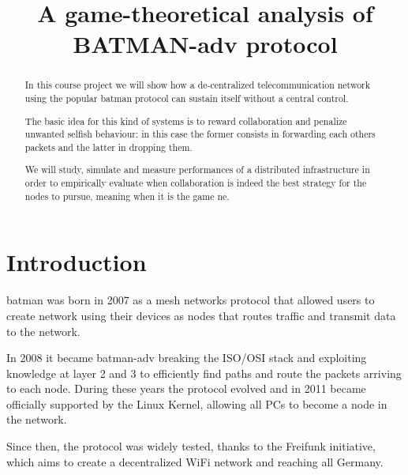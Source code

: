 \documentclass[conference]{IEEEtran}
\begin{document}
\title{A game-theoretical analysis of BATMAN-adv protocol}

\author{
\and
{}
}

\maketitle

\begin{abstract}
  In this course project we will show how a de-centralized telecommunication network using the popular \gls{batman} protocol can sustain itself without a central control.

  The basic idea for this kind of systems is to reward collaboration and penalize unwanted selfish behaviour: in this case the former consists in forwarding each others packets and the latter in dropping them.

  We will study, simulate and measure performances of a distributed infrastructure in order to empirically evaluate when collaboration is indeed the best strategy for the nodes to pursue, meaning when it is the game \gls{ne}.
\end{abstract}

\section{Introduction}


\gls{batman} was born in 2007 as a mesh networks protocol that allowed users to create network using their devices as nodes that routes traffic and transmit data to the network.

In 2008 it became \gls{batman}-adv breaking the ISO/OSI stack and exploiting knowledge at layer 2 and 3 to efficiently find paths and route the packets arriving to each node. During these years the protocol evolved and in 2011 became officially supported by the Linux Kernel, allowing all PCs to become a node in the network.

Since then, the protocol was widely tested, thanks to the Freifunk initiative, which aims to create a decentralized WiFi network and reaching all Germany.
\end{document}
